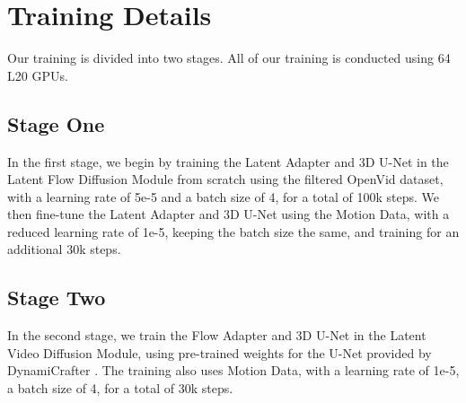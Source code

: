 \section{Training Details}
\label{sec:training}

Our training is divided into two stages. All of our training is conducted using 64 L20 GPUs.

\subsection{Stage One}
In the first stage, we begin by training the Latent Adapter and 3D U-Net in the Latent Flow Diffusion Module from scratch using the filtered OpenVid dataset, with a learning rate of 5e-5 and a batch size of 4, for a total of 100k steps. We then fine-tune the Latent Adapter and 3D U-Net using the Motion Data, with a reduced learning rate of 1e-5, keeping the batch size the same, and training for an additional 30k steps.

\subsection{Stage Two}
In the second stage, we train the Flow Adapter and 3D U-Net in the Latent Video Diffusion Module, using pre-trained weights for the U-Net provided by DynamiCrafter \cite{dynamicrafter}. The training also uses Motion Data, with a learning rate of 1e-5, a batch size of 4, for a total of 30k steps.
